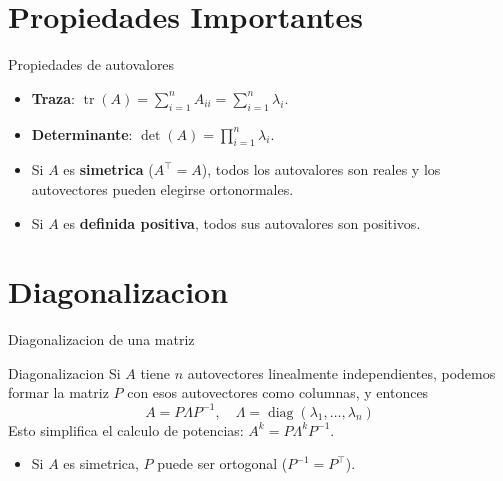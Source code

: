 \documentclass[aspectratio=169, 10pt, xcolor=table]{beamer}
\begin{document}
\section{Propiedades Importantes}

\begin{frame}{Propiedades de autovalores}
    \begin{itemize}
        \item \textbf{Traza}: $\operatorname{tr}(A) = \sum_{i=1}^n A_{ii} = \sum_{i=1}^n \lambda_i$.
        \item \textbf{Determinante}: $\det(A) = \prod_{i=1}^n \lambda_i$.
        \item Si $A$ es \textbf{simetrica} ($A^\top = A$), todos los autovalores son reales y los autovectores pueden elegirse ortonormales.
        \item Si $A$ es \textbf{definida positiva}, todos sus autovalores son positivos.
    \end{itemize}
\end{frame}

\section{Diagonalizacion}

\begin{frame}{Diagonalizacion de una matriz}
    \begin{block}{Diagonalizacion}
        Si $A$ tiene $n$ autovectores linealmente independientes, podemos formar la matriz $P$ con esos autovectores como columnas, y entonces
        \[
        A = P\Lambda P^{-1},\quad \Lambda = \operatorname{diag}(\lambda_1,\dots,\lambda_n)
        \]
        Esto simplifica el calculo de potencias: $A^k = P\Lambda^k P^{-1}$.
    \end{block}
    \begin{itemize}
        \item Si $A$ es simetrica, $P$ puede ser ortogonal ($P^{-1}=P^\top$).
    \end{itemize}
\end{frame}

\end{document}
